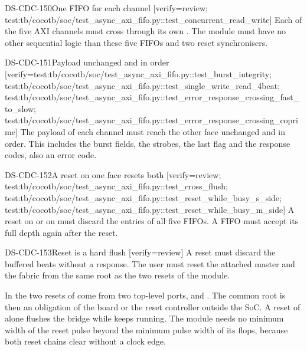 \begin{requirement}{DS-CDC-150}{One FIFO for each channel}
[verify={review; test:tb/cocotb/soc/test_async_axi_fifo.py::test_concurrent_read_write}]
Each of the five AXI channels must cross through its own . The module must have no other sequential logic than these five FIFOs and two reset synchronisers.
\end{requirement}

\begin{requirement}{DS-CDC-151}{Payload unchanged and in order}
[verify={test:tb/cocotb/soc/test_async_axi_fifo.py::test_burst_integrity; test:tb/cocotb/soc/test_async_axi_fifo.py::test_single_write_read_4beat; test:tb/cocotb/soc/test_async_axi_fifo.py::test_error_response_crossing_fast_to_slow; test:tb/cocotb/soc/test_async_axi_fifo.py::test_error_response_crossing_coprime}]
The payload of each channel must reach the other face unchanged and in order. This includes the burst fields, the strobes, the last flag and the response codes, also an error code.
\end{requirement}

\begin{requirement}{DS-CDC-152}{A reset on one face resets both}
[verify={review; test:tb/cocotb/soc/test_async_axi_fifo.py::test_cross_flush; test:tb/cocotb/soc/test_async_axi_fifo.py::test_reset_while_busy_s_side; test:tb/cocotb/soc/test_async_axi_fifo.py::test_reset_while_busy_m_side}]
A reset on  or on  must discard the entries of all five FIFOs. A FIFO must accept its full depth again after the reset.
\end{requirement}

\begin{requirement}{DS-CDC-153}{Reset is a hard flush}
[verify={review}]
A reset must discard the buffered beats without a response. The user must reset the attached master and the fabric from the same root as the two resets of the module.
\end{requirement}

\begin{information}
In  the two resets of  come from two top-level ports,  and . The common root is then an obligation of the board or the reset controller outside the SoC. A reset of  alone flushes the bridge while  keeps running. The module needs no minimum width of the reset pulse beyond the minimum pulse width of its flops, because both reset chains clear without a clock edge.
\end{information}

